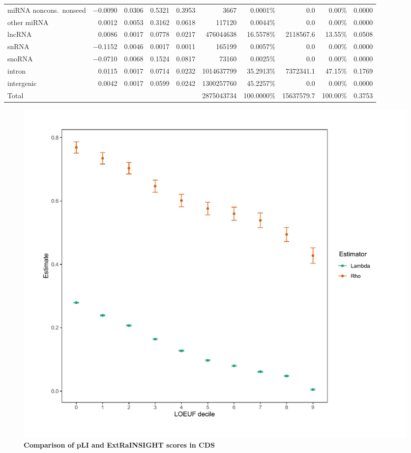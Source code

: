 \documentclass[11pt]{article}
\begin{document}
\begin{table}
\begin{footnotesize}
\begin{tabular}{lrrrrrrrrr}
miRNA noncons.\ nonseed & $-$0.0090 & 0.0306 & 0.5321 & 0.3953 & 3667 & 0.0001\% & 0.0 & 0.00\% & 0.0000\\
other miRNA & 0.0012 & 0.0053 & 0.3162 & 0.0618 & 117120 & 0.0044\% & 0.0 & 0.00\% & 0.0000\\
lncRNA & 0.0086 & 0.0017 & 0.0778 & 0.0217 & 476044638 & 16.5578\% &  2118567.6 & 13.55\% & 0.0508\\
snRNA & $-$0.1152 & 0.0046 & 0.0017 & 0.0011 & 165199 & 0.0057\% & 0.0 & 0.00\% & 0.0000\\
snoRNA & $-$0.0710 & 0.0068 & 0.1524 & 0.0817 & 73160 & 0.0025\% & 0.0 & 0.00\% & 0.0000\\
intron & 0.0115 & 0.0017 & 0.0714 & 0.0232 & 1014637799 & 35.2913\% &  7372341.1 & 47.15\% & 0.1769\\
intergenic & 0.0042 & 0.0017 & 0.0599 & 0.0242 & 1300257760 & 45.2257\% & 0.0 & 0.00\% & 0.0000\\
    \hline
Total &  &  &  &  & 2875043734 & 100.0000\% & 15637579.7 &  100.00\% & 0.3753\\
    \hline
  \end{tabular}
  \end{footnotesize}
\end{table}
\clearpage

\begin{figure}[t]
    \centering
    \includegraphics[width=0.75\linewidth]{figures/LOEUF.pdf}
    \caption{\textbf{Comparison of pLI and ExtRaINSIGHT scores in CDS}}
    \label{fig:loeuf}
\end{figure}

\clearpage 
\end{document}
